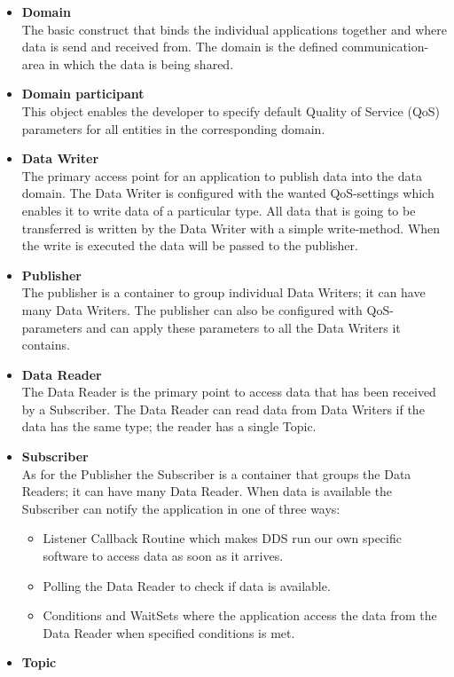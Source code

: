 \documentclass[Main]{subfiles}
\begin{document}
\begin{itemize}
  \item \textbf{Domain}\\The basic construct that binds the individual applications together and where data is send and received from. The domain is the defined communication-area in which the data is being shared.
  \item \textbf{Domain participant}\\This object enables the developer to specify default Quality of Service (QoS) parameters for all entities in the corresponding domain.
  \item \textbf{Data Writer}\\The primary access point for an application to publish data into the data domain. The Data Writer is configured with the wanted QoS-settings which enables it to write data of a particular type. All data that is going to be transferred is written by the Data Writer with a simple write-method. When the write is executed the data will be passed to the publisher. 
  \item \textbf{Publisher}\\The publisher is a container to group individual Data Writers; it can have many Data Writers. The publisher can also be configured with QoS-parameters and can apply these parameters to all the Data Writers it contains.
  \item \textbf{Data Reader}\\The Data Reader is the primary point to access data that has been received by a Subscriber. The Data Reader can read data from Data Writers if the data has the same type; the reader has a single Topic.
  \item \textbf{Subscriber}\\As for the Publisher the Subscriber is a container that groups the Data Readers; it can have many Data Reader. When data is available the Subscriber can notify the application in one of three ways:
  \begin{itemize}
  \item Listener Callback Routine which makes DDS run our own specific software to access data as soon as it arrives.
  \item Polling the Data Reader to check if data is available.
  \item Conditions and WaitSets where the application access the data from the Data Reader when specified conditions is met.
  \end{itemize}
  \item \textbf{Topic}
  \\\cite{RTI} \cite{opendds}
\end{itemize}
\end{document}

